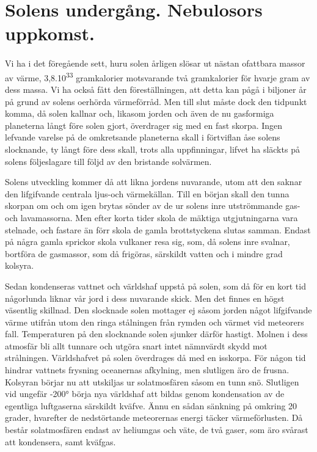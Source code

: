 \documentclass[a4paper, 12pt, oneside, swedish]{article}
\begin{document}
\section{Solens undergång. Nebulosors uppkomst.}
\paragraph{}
Vi ha i det föregående sett, huru solen årligen slösar ut nästan ofattbara massor av värme, 3,8.10\textsuperscript{33} gramkalorier motsvarande två gramkalorier för hvarje gram av dess massa. Vi ha också fått den föreställningen, att detta kan pågå i biljoner år på grund av solens oerhörda värmeförråd. Men till slut måste dock den tidpunkt komma, då solen kallnar och, likasom jorden och även de nu gasformiga planeterna långt före solen gjort, överdrager sig med en fast skorpa. Ingen lefvande varelse på de omkretsande planeterna skall i förtviflan åse solens slocknande, ty långt före dess skall, trots alla uppfinningar, lifvet ha släckts på solens följeslagare till följd av den bristande solvärmen.

Solens utveckling kommer då att likna jordens nuvarande, utom att den saknar den lifgifvande centrala ljus-och värmekällan. Till en början skall den tunna skorpan om och om igen brytas sönder av de ur solens inre utströmmande gas- och lavamassorna. Men efter korta tider skola de mäktiga utgjutningarna vara stelnade, och fastare än förr skola de gamla brottstyckena slutas samman. Endast på några gamla sprickor skola vulkaner resa sig, som, då solens inre svalnar, bortföra de gasmassor, som då frigöras, särskildt vatten och i mindre grad kolsyra.

Sedan kondenseras vattnet och världshaf uppstå på solen, som då för en kort tid någorlunda liknar vår jord i dess nuvarande skick. Men det finnes en högst väsentlig skillnad. Den slocknade solen mottager ej såsom jorden något lifgifvande värme utifrån utom den ringa stålningen från rymden och värmet vid meteorers fall. Temperaturen på den slocknande solen sjunker därför hastigt. Molnen i dess atmosfär bli allt tunnare och utgöra snart intet nämnvärdt skydd mot strålningen. Världshafvet på solen överdrages då med en isskorpa. För någon tid hindrar vattnets frysning oceanernas afkylning, men slutligen äro de frusna. Kolsyran börjar nu att utskiljas ur solatmosfären såsom en tunn snö. Slutligen vid ungefär -200° börja nya världshaf att bildas genom kondensation av de egentliga luftgaserna särskildt kväfve. Ännu en sådan sänkning på omkring 20 grader, hvarefter de nedstörtande meteorernas energi täcker värmeförlusten. Då består solatmosfären endast av heliumgas och väte, de två gaser, som äro svårast att kondensera, samt kväfgas.
\end{document}
